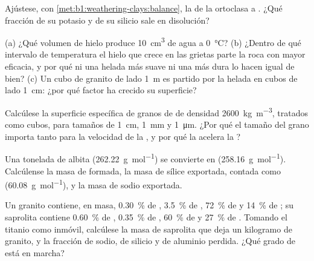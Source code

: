 \begin{exercise}[$\star$]\label{exo:b1:weathering-clays:3}
Ajústese, con \cref{met:b1:weathering-clays:balance}, la  de la ortoclasa  a . ¿Qué fracción de su potasio y de
su silicio sale en disolución?
\end{exercise}

\begin{exercise}[$\star$]\label{exo:b1:weathering-clays:4}
(a) ¿Qué volumen de hielo produce \qty{10}{cm^3} de agua a \qty{0}{\celsius}? (b) ¿Dentro de qué intervalo de temperatura el hielo que crece en las
grietas parte la roca con mayor eficacia, y por qué ni una helada más suave ni una más dura lo hacen igual de bien? (c) Un cubo de granito de lado
\qty{1}{m} es partido por la helada en cubos de lado \qty{1}{cm}: ¿por qué factor ha crecido su superficie?
\end{exercise}

\begin{exercise}[$\star\star$]\label{exo:b1:weathering-clays:5}
Calcúlese la superficie específica de granos de  de densidad \qty{2600}{kg.m^{-3}}, tratados como cubos, para tamaños de \qty{1}{cm},
\qty{1}{mm} y \qty{1}{\micro m}. ¿Por qué el tamaño del grano importa tanto para la velocidad de la , y por qué la  acelera la ?
\end{exercise}

\begin{exercise}[$\star\star$]\label{exo:b1:weathering-clays:6}
Una tonelada de albita  (\qty{262.22}{g.mol^{-1}}) se convierte en  (\qty{258.16}{g.mol^{-1}}). Calcúlense la masa de 
formada, la masa de sílice exportada, contada como  (\qty{60.08}{g.mol^{-1}}), y la masa de sodio exportada.
\end{exercise}

\begin{exercise}[$\star\star$]\label{exo:b1:weathering-clays:7}
Un granito contiene, en masa, \qty{0.30}{\percent} de , \qty{3.5}{\percent}
de , \qty{72}{\percent} de  y \qty{14}{\percent} de ; su saprolita
contiene \qty{0.60}{\percent} de , \qty{0.35}{\percent}
de , \qty{60}{\percent} de  y \qty{27}{\percent} de .
Tomando el titanio como inmóvil, calcúlese la masa de saprolita que deja un kilogramo de
granito, y la fracción de sodio, de silicio y de aluminio perdida. ¿Qué grado de
 está en marcha?
\end{exercise}

